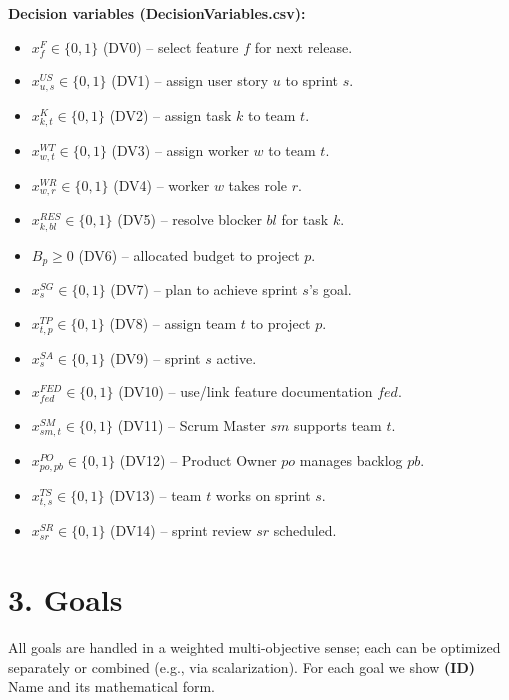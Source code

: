 \documentclass[11pt,a4paper]{article}
\begin{document}
\medskip
\noindent \textbf{Decision variables (DecisionVariables.csv):}
\begin{itemize}
  \item $x^{F}_{f} \in \{0,1\}$ (DV0) -- select feature $f$ for next release.
  \item $x^{US}_{u,s} \in \{0,1\}$ (DV1) -- assign user story $u$ to sprint $s$.
  \item $x^{K}_{k,t} \in \{0,1\}$ (DV2) -- assign task $k$ to team $t$.
  \item $x^{WT}_{w,t} \in \{0,1\}$ (DV3) -- assign worker $w$ to team $t$.
  \item $x^{WR}_{w,r} \in \{0,1\}$ (DV4) -- worker $w$ takes role $r$.
  \item $x^{RES}_{k,bl} \in \{0,1\}$ (DV5) -- resolve blocker $bl$ for task $k$.
  \item $B_p \ge 0$ (DV6) -- allocated budget to project $p$.
  \item $x^{SG}_{s} \in \{0,1\}$ (DV7) -- plan to achieve sprint $s$'s goal.
  \item $x^{TP}_{t,p} \in \{0,1\}$ (DV8) -- assign team $t$ to project $p$.
  \item $x^{SA}_{s} \in \{0,1\}$ (DV9) -- sprint $s$ active.
  \item $x^{FED}_{fed} \in \{0,1\}$ (DV10) -- use/link feature documentation $fed$.
  \item $x^{SM}_{sm,t} \in \{0,1\}$ (DV11) -- Scrum Master $sm$ supports team $t$.
  \item $x^{PO}_{po,pb} \in \{0,1\}$ (DV12) -- Product Owner $po$ manages backlog $pb$.
  \item $x^{TS}_{t,s} \in \{0,1\}$ (DV13) -- team $t$ works on sprint $s$.
  \item $x^{SR}_{sr} \in \{0,1\}$ (DV14) -- sprint review $sr$ scheduled.
\end{itemize}

\section{3. Goals}
All goals are handled in a weighted multi-objective sense; each can be optimized separately or combined (e.g., via scalarization). For each goal we show \textbf{(ID)} Name and its mathematical form.
\end{document}
